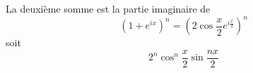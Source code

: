 \begin{enumerate}
La deuxi{\`e}me somme est la partie imaginaire de
\begin{displaymath}
 \left( 1+e^{ix}\right)^{n} = \left( 2\cos\frac{x}{2}e^{i\frac{x}{2}}\right)^{n}
\end{displaymath}
soit
\begin{displaymath}
2^{n}\cos^{n}\frac{x}{2}\sin\frac{nx}{2} 
\end{displaymath}


\end{enumerate}
